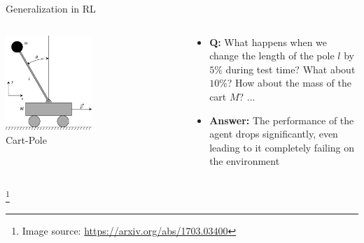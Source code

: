 \documentclass[aspectratio=169]{../latex_main/tntbeamer}  %
\begin{document}
\begin{frame}{Generalization in RL}
    \begin{columns}
        \begin{center}
            \includegraphics[width=0.5\textwidth]{images/t03/cart-pole.png}\\
            Cart-Pole
            \end{center}
        
        \begin{center}
           \begin{itemize}
               \item \textbf{Q:} What happens when we change the length of the pole $l$ by $5\%$ during test time? What about $10\%$? How about the mass of the cart $M$? ...
               \pause 
               \item \textbf{Answer:} The performance of the agent drops significantly, even leading to it completely failing on the environment
           \end{itemize}
            
        \end{center}
    
    \end{columns}

    \footnote{Image source: \url{https://arxiv.org/abs/1703.03400}}
\end{frame}
\end{document}
